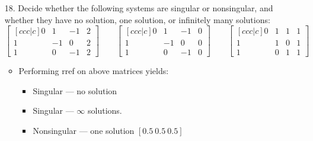 \begin{itemize}
\begin{enumerate}
      \item[18.] Decide whether the following systems are singular or
        nonsingular, and whether they have no solution, one solution, or
        infinitely many solutions:
        \[%
        \begin{bmatrix}[ccc|c]
          0 & 1 & -1 & 2 \\
          1 & -1 & 0 & 2 \\
          1 & 0 & -1 & 2
        \end{bmatrix} \qquad
        \begin{bmatrix}[ccc|c]
          0 & 1 & -1 & 0 \\
          1 & -1 & 0 & 0 \\
          1 & 0 & -1 & 0
        \end{bmatrix} \qquad
        \begin{bmatrix}[ccc|c]
          0 & 1 & 1 & 1 \\
          1 & 1 & 0 & 1 \\
          1 & 0 & 1 & 1
        \end{bmatrix}
        \]%

      \begin{itemize}\color{foreground}
        \item Performing rref on above matrices yields:
          \begin{itemize}
            \item Singular --- no solution

            \item Singular --- \(\infty\) solutions.

            \item Nonsingular --- one solution \([0.5~0.5~0.5]\)
          \end{itemize}
      \end{itemize}
    \end{enumerate}

    \newpage

\end{itemize}
